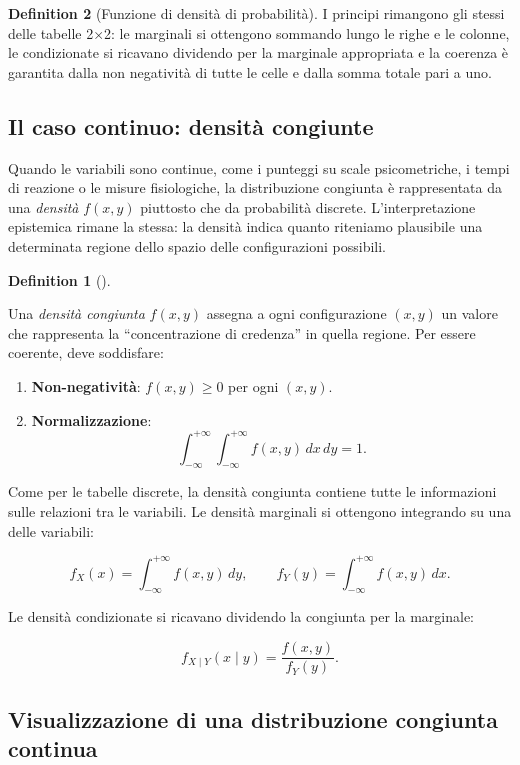 \documentclass[
  letterpaper,
  DIV=11,
  numbers=noendperiod,
  oneside]{scrreprt}
\theoremstyle{definition}
\theoremstyle{plain}
\theoremstyle{definition}
\newtheorem{definition}{Definition}[chapter]
\theoremstyle{remark}
\begin{document}
\begin{definition}[Funzione di densità di
probabilità]
I principi rimangono gli stessi delle tabelle 2×2: le marginali si
ottengono sommando lungo le righe e le colonne, le condizionate si
ricavano dividendo per la marginale appropriata e la coerenza è
garantita dalla non negatività di tutte le celle e dalla somma totale
pari a uno.

\subsection{Il caso continuo: densità
congiunte}\label{il-caso-continuo-densituxe0-congiunte}

Quando le variabili sono continue, come i punteggi su scale
psicometriche, i tempi di reazione o le misure fisiologiche, la
distribuzione congiunta è rappresentata da una \emph{densità} \(f(x,y)\)
piuttosto che da probabilità discrete. L'interpretazione epistemica
rimane la stessa: la densità indica quanto riteniamo plausibile una
determinata regione dello spazio delle configurazioni possibili.

\begin{definition}[]\protect\hypertarget{def-joint-density}{}\label{def-joint-density}

Una \emph{densità congiunta} \(f(x,y)\) assegna a ogni configurazione
\((x,y)\) un valore che rappresenta la ``concentrazione di credenza'' in
quella regione. Per essere coerente, deve soddisfare:

\begin{enumerate}
\def\labelenumi{\arabic{enumi}.}
\item
  \textbf{Non-negatività}: \(f(x,y) \geq 0\) per ogni \((x,y)\).
\item
  \textbf{Normalizzazione}:
  \[\int_{-\infty}^{+\infty}\int_{-\infty}^{+\infty} f(x,y)\,dx\,dy = 1.\]
\end{enumerate}

\end{definition}

Come per le tabelle discrete, la densità congiunta contiene tutte le
informazioni sulle relazioni tra le variabili. Le densità marginali si
ottengono integrando su una delle variabili:

\[
f_X(x) = \int_{-\infty}^{+\infty} f(x,y) \, dy, \qquad f_Y(y) = \int_{-\infty}^{+\infty} f(x,y) \, dx.
\]

Le densità condizionate si ricavano dividendo la congiunta per la
marginale:

\[
f_{X \mid Y}(x \mid y) = \frac{f(x,y)}{f_Y(y)}.
\]

\subsection{Visualizzazione di una distribuzione congiunta
continua}\label{visualizzazione-di-una-distribuzione-congiunta-continua}


\end{definition}
\end{document}

